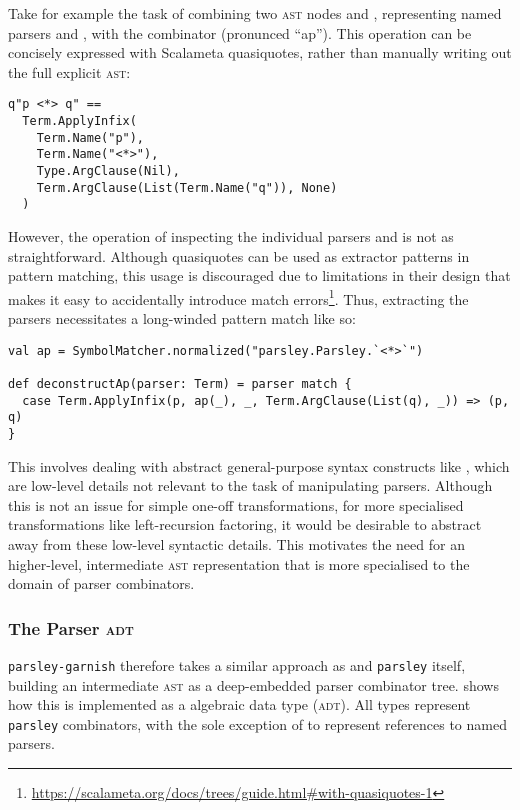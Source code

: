 \documentclass[../../main.tex]{subfiles}
\begin{document}
Take for example the task of combining two \textsc{ast} nodes  and , representing named parsers  and , with the combinator \scala{<*>} (pronunced ``ap'').
This operation can be concisely expressed with Scalameta quasiquotes, rather than manually writing out the full explicit \textsc{ast}:
\begin{verbatim}
q"p <*> q" ==
  Term.ApplyInfix(
    Term.Name("p"),
    Term.Name("<*>"),
    Type.ArgClause(Nil),
    Term.ArgClause(List(Term.Name("q")), None)
  )
\end{verbatim}
However, the  operation of inspecting the individual parsers  and  is not as straightforward.
Although quasiquotes can be used as extractor patterns in pattern matching, this usage is discouraged due to limitations in their design that makes it easy to accidentally introduce match errors\footnote{\url{https://scalameta.org/docs/trees/guide.html#with-quasiquotes-1}}.
Thus, extracting the parsers necessitates a long-winded pattern match like so:
\begin{verbatim}
val ap = SymbolMatcher.normalized("parsley.Parsley.`<*>`")

def deconstructAp(parser: Term) = parser match {
  case Term.ApplyInfix(p, ap(_), _, Term.ArgClause(List(q), _)) => (p, q)
}
\end{verbatim}
This involves dealing with abstract general-purpose syntax constructs like , which are low-level details not relevant to the task of manipulating parsers.
Although this is not an issue for simple one-off transformations, for more specialised transformations like left-recursion factoring, it would be desirable to abstract away from these low-level syntactic details.
This motivates the need for an higher-level, intermediate \textsc{ast} representation that is more specialised to the domain of parser combinators.

\subsubsection{The Parser \textsc{adt}}
\texttt{parsley-garnish} therefore takes a similar approach as \textcite{baars_leftrec_2004} and \texttt{parsley} itself, building an intermediate \textsc{ast} as a deep-embedded parser combinator tree.
 shows how this is implemented as a  algebraic data type (\textsc{adt}).
All  types represent \texttt{parsley} combinators, with the sole exception of  to represent references to named parsers.
\end{document}
